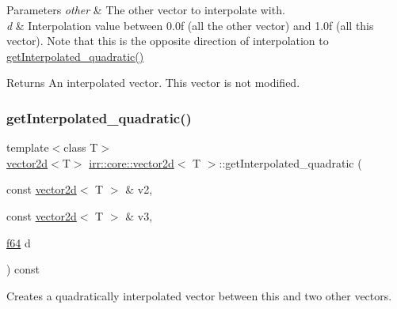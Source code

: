 \begin{DoxyParams}{Parameters}
{\em other} & The other vector to interpolate with. \\
\hline
{\em d} & Interpolation value between 0.\+0f (all the other vector) and 1.\+0f (all this vector). Note that this is the opposite direction of interpolation to \hyperlink{classirr_1_1core_1_1vector2d_aa4bfe9ae4f1e354eeac2ee8d9c2ca7fd}{get\+Interpolated\+\_\+quadratic()} \\
\hline
\end{DoxyParams}
\begin{DoxyReturn}{Returns}
An interpolated vector. This vector is not modified. 
\end{DoxyReturn}
\mbox{\label{classirr_1_1core_1_1vector2d_aa4bfe9ae4f1e354eeac2ee8d9c2ca7fd}} 
\subsubsection{\texorpdfstring{get\+Interpolated\+\_\+quadratic()}{getInterpolated\_quadratic()}\hspace{0.1cm}{\footnotesize\ttfamily [1/2]}}
{\footnotesize\ttfamily template$<$class T$>$ \\
\hyperlink{classirr_1_1core_1_1vector2d}{vector2d}$<$T$>$ \hyperlink{classirr_1_1core_1_1vector2d}{irr\+::core\+::vector2d}$<$ T $>$\+::get\+Interpolated\+\_\+quadratic (\begin{DoxyParamCaption}\item[{const \hyperlink{classirr_1_1core_1_1vector2d}{vector2d}$<$ T $>$ \&}]{v2,  }\item[{const \hyperlink{classirr_1_1core_1_1vector2d}{vector2d}$<$ T $>$ \&}]{v3,  }\item[{\hyperlink{namespaceirr_a1325b02603ad449f92c68fc640af9b28}{f64}}]{d }\end{DoxyParamCaption}) const\hspace{0.3cm}{\ttfamily [inline]}}



Creates a quadratically interpolated vector between this and two other vectors. 



